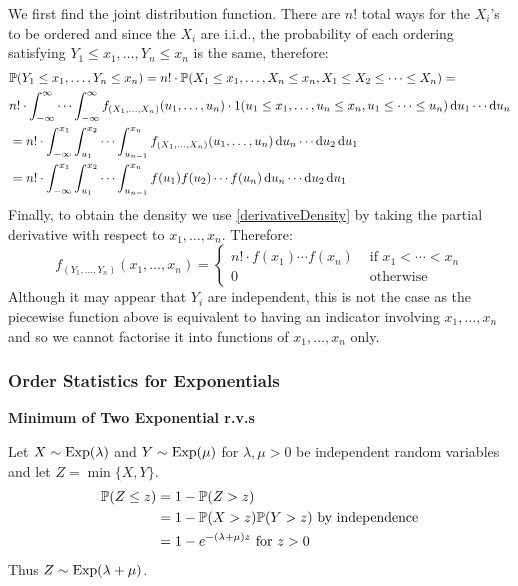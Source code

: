 \documentclass[../main.tex]{subfiles}
\begin{document}
We first find the joint distribution function.
There are $n!$ total ways for the $X_i$'s to be ordered and since the $X_i$ are i.i.d., the probability of each ordering satisfying $Y_1 \leq x_1, \ldots, Y_n \leq x_n$ is the same, therefore:
\begin{align*}
  &\P(Y_1 \leq x_1, \ldots, Y_n \leq x_n) = n! \cdot \P(X_1 \leq x_1, \ldots, X_n \leq x_n, X_1 \leq X_2 \leq \cdots \leq X_n) =\\
  &n! \cdot \int_{-\infty}^{\infty}  \cdots \int_{-\infty}^{\infty} f_{(X_1, \ldots, X_n)}(u_1, \ldots, u_n) \cdot 1(u_1 \leq x_1, \ldots, u_n \leq x_n, u_1 \leq \cdots \leq u_n) \d{u_1} \cdots \d{u_n} \\
                                         &= n! \cdot \int_{-\infty}^{x_1} \int_{u_1}^{x_2} \cdots \int_{u_{n - 1}}^{x_n} f_{(X_1, \ldots, X_n)}(u_1, \ldots, u_n) \d{u_n} \cdots \d{u_2} \d{u_1} \\
                                         &= n! \cdot \int_{-\infty}^{x_1} \int_{u_1}^{x_2} \cdots \int_{u_{n - 1}}^{x_n} f(u_1)f(u_2) \cdots f(u_n) \d{u_n} \cdots \d{u_2} \d{u_1}
\end{align*}
Finally, to obtain the density we use \cref{derivativeDensity} by taking the partial derivative with respect to $x_1, \ldots, x_n$.
Therefore:
\begin{equation}
  f_{(Y_1, \ldots, Y_n)}(x_1, \ldots, x_n) = \begin{cases}
  n! \cdot f(x_1) \cdots f(x_n) & \text{ if } x_1 < \cdots <x_n \\
  0 & \text{ otherwise}
  \end{cases} \label{orderJointDensity}
\end{equation}
Although it may appear that $Y_i$ are independent, this is not the case as the piecewise function above is equivalent to having an indicator involving $x_1, \ldots, x_n$ and so we cannot factorise it into functions of $x_1, \ldots, x_n$ only.
\subsubsection{Order Statistics for Exponentials}
\textbf{Minimum of Two Exponential r.v.s}\par
Let $X \sim \Exponential(\lambda)$ and $Y \sim \Exponential(\mu)$ for $\lambda, \mu > 0$ be independent random variables and let $Z = \min\{X, Y\}$.
\begin{align*}
  \P(Z \leq z) &= 1 - \P(Z > z) \\
               &= 1- \P(X > z)\P(Y > z) \text{ by independence} \\
               &= 1 - e^{-(\lambda + \mu)z} \text{ for $z > 0$}
\end{align*}
Thus $Z \sim \Exponential(\lambda + \mu)$.
\end{document}
